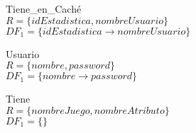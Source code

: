 \item{{\large Tiene\_en\_Caché}}\\
	$R = \{idEstadistica,nombreUsuario\}$\\
	$DF_1 = \{idEstadistica \rightarrow nombreUsuario\}$\\

\item {{\large Usuario}}\\
	$R = \{nombre, password\}$\\
	$DF_1 = \{nombre \rightarrow password\}$\\

\item{{\large Tiene}}\\
	$R = \{nombreJuego, nombreAtributo\}$\\
	$DF_1 = \{\}$
